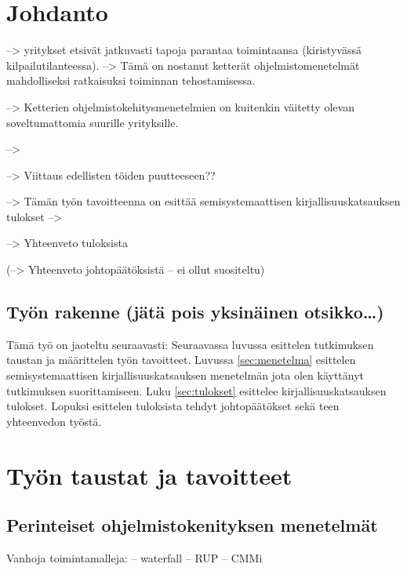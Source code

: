 
\section{Johdanto}

--> yritykset etsivät jatkuvasti tapoja parantaa toimintaansa (kiristyvässä
kilpailutilanteessa). --> Tämä on nostanut ketterät ohjelmistomenetelmät
mahdolliseksi ratkaisuksi toiminnan tehostamisessa.

--> Ketterien ohjelmistokehitysmenetelmien on kuitenkin väitetty olevan
soveltumattomia suurille yrityksille.

--> 

--> Viittaus edellisten töiden puutteeseen??

--> Tämän työn tavoitteenna on esittää semisystemaattisen kirjallisuuskatsauksen
tulokset -->

--> Yhteenveto tuloksista

(--> Yhteenveto johtopäätöksistä -- ei ollut suositeltu)



\subsection{Työn rakenne (jätä pois yksinäinen otsikko\ldots)}

Tämä työ on jaoteltu seuraavasti:
Seuraavassa luvussa esittelen tutkimuksen taustan ja määrittelen työn
tavoitteet. Luvussa \ref{sec:menetelma} esittelen semisystemaattisen
kirjallisuuskatsauksen menetelmän jota olen käyttänyt tutkimuksen
suorittamiseen. Luku \ref{sec:tulokset} esittelee kirjallisuuskatsauksen
tulokset. Lopuksi esittelen tuloksista tehdyt johtopäätökset sekä teen
yhteenvedon työstä.



\section{Työn taustat ja tavoitteet}
\label{sec:tausta}

\subsection{Perinteiset ohjelmistokenityksen menetelmät}

Vanhoja toimintamalleja:
-- waterfall
-- RUP
-- CMMi

